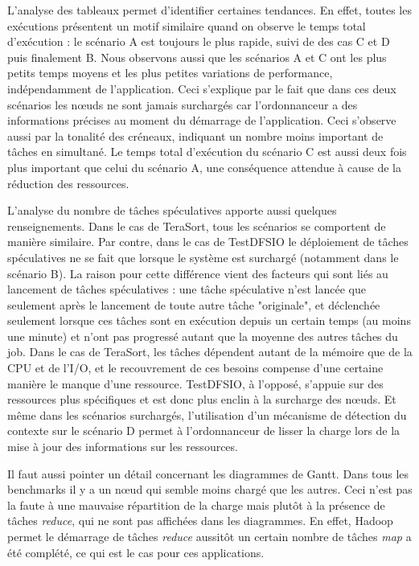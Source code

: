 L'analyse des tableaux permet d'identifier certaines tendances. En effet, toutes les exécutions présentent un motif similaire quand on observe le temps total d'exécution : le scénario A est toujours le plus rapide, suivi de des cas C et D puis finalement  B. Nous observons aussi que les scénarios A et C ont les plus petits temps moyens et les plus petites variations de performance, indépendamment de l'application. Ceci s'explique par le fait que dans ces deux scénarios les n{\oe}uds ne sont jamais surchargés car l'ordonnanceur a des informations précises au moment du démarrage de l'application. Ceci s'observe aussi par la tonalité des créneaux, indiquant un nombre moins important de tâches en simultané. Le temps total d'exécution du scénario C est aussi deux fois plus important que celui du scénario A, une conséquence attendue à cause de la réduction des ressources. 

L'analyse du nombre de tâches spéculatives apporte aussi quelques renseignements. Dans le cas de TeraSort, tous les scénarios se comportent de manière similaire. Par contre, dans le cas de TestDFSIO le déploiement de tâches spéculatives ne se fait que lorsque le système est surchargé (notamment dans le scénario B). La raison pour cette différence vient des facteurs qui sont liés au lancement de tâches spéculatives : une tâche spéculative n'est lancée que seulement après le lancement de toute autre tâche "originale", et déclenchée seulement lorsque ces tâches sont en exécution depuis un certain temps (au moins une minute) et n'ont pas progressé autant que la moyenne des autres tâches du job. Dans le cas de TeraSort, les tâches dépendent autant de la mémoire que de la CPU et de l'I/O, et le recouvrement de ces besoins compense d'une certaine manière le manque d'une ressource. TestDFSIO, à l'opposé, s'appuie sur des ressources plus spécifiques et est donc plus enclin à la surcharge des n{\oe}uds. Et même dans les scénarios surchargés, l'utilisation d'un mécanisme de détection du contexte sur le scénario D permet à l'ordonnanceur de lisser la charge lors de la mise à jour des informations sur les ressources.

Il faut aussi pointer un détail concernant les diagrammes de Gantt. Dans tous les benchmarks il y a un n{\oe}ud qui semble moins chargé que les autres. Ceci n'est pas la faute à une mauvaise répartition de la charge mais plutôt à la présence de tâches \textit{reduce}, qui ne sont pas affichées dans les diagrammes. En effet, Hadoop permet le démarrage de tâches \textit{reduce} aussitôt un certain nombre de tâches \textit{map} a été complété, ce qui est le cas pour ces applications.



